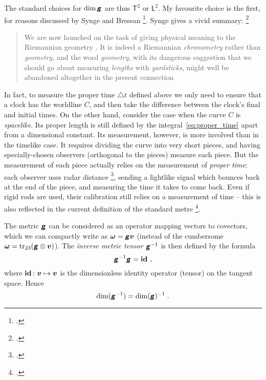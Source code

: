 \documentclass[a4paper,12pt,onecolumn,oneside,article,british]{memoir}
\makeatletter
\newcommand*{\mathte}[1]{\textbf{\textit{\textsf{#1}}}}
\newcommand*{\citep}{\footcites}
\DeclareMathOperator{\tr}{tr}%
\newcommand*{\incr}{\triangle}%
\newcommand*{\defd}{\coloneqq}
\newcommand*{\sect}{\S}%
\newcommand*{\sects}{\S\S}%
\newcommand*{\q}{}%
\DeclareRobustCommand*{\q}{%
  \mathbin{\mathpalette\bigcdot@{}}%
}
\newcommand*{\bigcdot@scalefactor}{0.7}
\newcommand*{\bigcdot@widthfactor}{1.5}
\newcommand*{\bigcdot@}[2]{%
  \sbox0{$#1\vcenter{}$}%
  \sbox2{$#1\cdot\m@th$}%
  \hbox to \bigcdot@widthfactor\wd2{%
    \hfil
    \raise\ht0\hbox{%
      \scalebox{\bigcdot@scalefactor}{%
        \lower\ht0\hbox{$#1\bullet\m@th$}%
      }%
    }%
    \hfil
  }%
}
\newcommand*{\Un}{\textsf{1}}
\newcommand*{\Le}{\textsf{L}}
\newcommand*{\Ti}{\textsf{T}}
\newcommand*{\yg}{\mathte{g}}
\newcommand*{\yom}{\bm{\omega}}
\newcommand*{\yv}{\bm{v}}
\renewcommand*{\i}{\indices}
\newcommand*{\inct}{\incr t}
\newcommand*{\id}{\mathbf{id}}%
\makeatother
\begin{document}
The standard choices for $\dim{\yg}$ are thus $\Ti^{2}$ or $\Le^{2}$. My
favourite choice is the first, for reasons discussed by Synge and Bressan
\citep[\sects~III.2--4]{synge1960b}[\sects~15, 18]{bressan1978}. Synge
gives a vivid summary: \citep[\sect~III.3 pp.~108--109]{synge1960b}
\begin{quote}\footnotesize
  We are now launched on the task of giving physical meaning to the
  Riemannian geometry \textelp{}. It is indeed a Riemannian
  \emph{chronometry} rather than \emph{geometry}, and the word
  \emph{geometry}, with its dangerous suggestion that we should go about
  measuring \emph{lengths} with \emph{yardsticks}, might well be abandoned
  altogether in the present connection
\end{quote}
In fact, to measure the proper time $\inct$ defined above we only need to
ensure that a clock has the worldline $C$, and then take the difference
between the clock's final and initial times. On the other hand, consider
the case when the curve $C$ is \emph{spacelike}. Its proper length is still
defined by the integral~\eqref{eq:proper_time} apart from a dimensional
constant. Its measurement, however, is more involved than in the timelike
case. It requires dividing the curve into very short pieces, and having
specially-chosen observers (orthogonal to the pieces) measure each piece.
But the measurement of each piece actually relies on the measurement of
\emph{proper time}: each observer uses radar distance
\citep[\sect~84]{landauetal1939_t1996}, sending a lightlike signal which
bounces back at the end of the piece, and measuring the time it takes to
come back. Even if rigid rods are used, their calibration still relies on a
measurement of time -- this is also reflected in the current definition of
the standard metre \citep[p.~98]{bipm1983}[p.~25]{giacomo1984}.


\medskip

The metric $\yg$ can be considered as an operator mapping vectors to
covectors, which we can compactly write as $\yom=\yg\yv$ (instead of the cumbersome
$\yom = \tr_{23}(\yg\otimes\yv)$). The \emph{inverse metric tensor}
$\yg\i{^{-1}^{\q\q}}$ is then defined by the formula
\begin{equation}
  \label{eq:inverse_g}
  \yg^{-1}\yg = \id\i{^{\q}_{\q}} \;,
\end{equation}
where $\id\i{^{\q}_{\q}}\colon \bm{v} \mapsto \bm{v}$ is the dimensionless
identity operator (tensor) on the tangent space. Hence
\begin{equation}
  \label{eq:dim_ig}
  \dim(\yg^{-1}) = \dim(\yg)^{-1} \;.
\end{equation}
\end{document}
